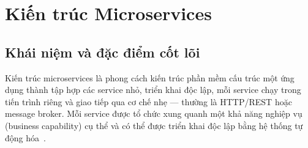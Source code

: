 \documentclass[../DoAn.tex]{subfiles}
\begin{document}



\section{Kiến trúc Microservices}
\label{section:2.1}

\subsection{Khái niệm và đặc điểm cốt lõi}

Kiến trúc microservices là phong cách kiến trúc phần mềm cấu trúc một ứng dụng thành tập
hợp các service nhỏ, triển khai độc lập, mỗi service chạy trong tiến trình riêng và giao
tiếp qua cơ chế nhẹ --- thường là HTTP/REST hoặc message broker. Mỗi service được tổ chức
xung quanh một khả năng nghiệp vụ (business capability) cụ thể và có thể được triển khai
độc lập bằng hệ thống tự động hóa~\cite{fowler2014, newman2021}.
\end{document}

